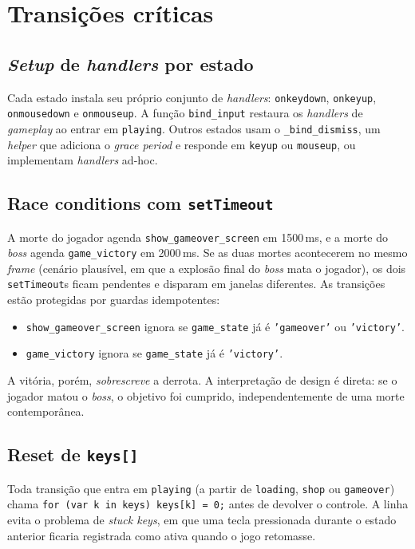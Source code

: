 \section{Transições críticas}

\subsection{\emph{Setup} de \emph{handlers} por estado}

Cada estado instala seu próprio conjunto de \emph{handlers}: \texttt{onkeydown},
\texttt{onkeyup}, \texttt{onmousedown} e \texttt{onmouseup}. A função
\texttt{bind\_input} restaura os \emph{handlers} de \emph{gameplay} ao entrar em
\texttt{playing}. Outros estados usam o \texttt{\_bind\_dismiss}, um \emph{helper}
que adiciona o \emph{grace period} e responde em \texttt{keyup} ou \texttt{mouseup},
ou implementam \emph{handlers} ad-hoc.

\subsection{Race conditions com \texttt{setTimeout}}

A morte do jogador agenda \texttt{show\_gameover\_screen} em 1500\,ms, e a morte do
\emph{boss} agenda \texttt{game\_victory} em 2000\,ms. Se as duas mortes acontecerem
no mesmo \emph{frame} (cenário plausível, em que a explosão final do \emph{boss}
mata o jogador), os dois \texttt{setTimeout}s ficam pendentes e disparam em janelas
diferentes. As transições estão protegidas por guardas idempotentes:

\begin{itemize}
  \item \texttt{show\_gameover\_screen} ignora se \texttt{game\_state} já é
    \texttt{'gameover'} ou \texttt{'victory'}.
  \item \texttt{game\_victory} ignora se \texttt{game\_state} já é \texttt{'victory'}.
\end{itemize}

A vitória, porém, \emph{sobrescreve} a derrota. A interpretação de design é direta:
se o jogador matou o \emph{boss}, o objetivo foi cumprido, independentemente de uma
morte contemporânea.

\subsection{Reset de \texttt{keys[]}}

Toda transição que entra em \texttt{playing} (a partir de \texttt{loading},
\texttt{shop} ou \texttt{gameover}) chama
\texttt{for (var k in keys) keys[k] = 0;} antes de devolver o controle. A linha evita
o problema de \emph{stuck keys}, em que uma tecla pressionada durante o estado
anterior ficaria registrada como ativa quando o jogo retomasse.
